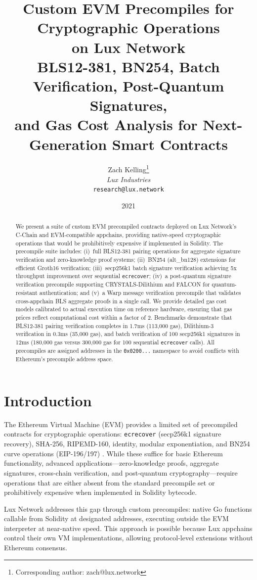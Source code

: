 \documentclass[11pt,a4paper]{article}
\title{\textbf{Custom EVM Precompiles for Cryptographic Operations\\on Lux Network}\\[6pt]
\large BLS12-381, BN254, Batch Verification, Post-Quantum Signatures,\\and Gas Cost Analysis for Next-Generation Smart Contracts}
\author{
Zach Kelling\thanks{Corresponding author: zach@lux.network}\\
\textit{Lux Industries}\\
\texttt{research@lux.network}
}
\date{2021}
\begin{document}
\luxcoverpage

\begin{abstract}
We present a suite of custom EVM precompiled contracts deployed on Lux Network's C-Chain and EVM-compatible appchains, providing native-speed cryptographic operations that would be prohibitively expensive if implemented in Solidity. The precompile suite includes: (i)~full BLS12-381 pairing operations for aggregate signature verification and zero-knowledge proof systems; (ii)~BN254 (alt\_bn128) extensions for efficient Groth16 verification; (iii)~secp256k1 batch signature verification achieving 5x throughput improvement over sequential \texttt{ecrecover}; (iv)~a post-quantum signature verification precompile supporting CRYSTALS-Dilithium and FALCON for quantum-resistant authentication; and (v)~a Warp message verification precompile that validates cross-appchain BLS aggregate proofs in a single call. We provide detailed gas cost models calibrated to actual execution time on reference hardware, ensuring that gas prices reflect computational cost within a factor of 2. Benchmarks demonstrate that BLS12-381 pairing verification completes in 1.7ms (113,000 gas), Dilithium-3 verification in 0.3ms (35,000 gas), and batch verification of 100 secp256k1 signatures in 12ms (180,000 gas versus 300,000 gas for 100 sequential \texttt{ecrecover} calls). All precompiles are assigned addresses in the \texttt{0x0200...} namespace to avoid conflicts with Ethereum's precompile address space.
\end{abstract}

\section{Introduction}

The Ethereum Virtual Machine (EVM) provides a limited set of precompiled contracts for cryptographic operations: \texttt{ecrecover} (secp256k1 signature recovery), SHA-256, RIPEMD-160, identity, modular exponentiation, and BN254 curve operations (EIP-196/197) \cite{buterin2014ethereum, eip196, eip197}. While these suffice for basic Ethereum functionality, advanced applications---zero-knowledge proofs, aggregate signatures, cross-chain verification, and post-quantum cryptography---require operations that are either absent from the standard precompile set or prohibitively expensive when implemented in Solidity bytecode.

Lux Network addresses this gap through custom precompiles: native Go functions callable from Solidity at designated addresses, executing outside the EVM interpreter at near-native speed. This approach is possible because Lux appchains control their own VM implementations, allowing protocol-level extensions without Ethereum consensus.
\end{document}
